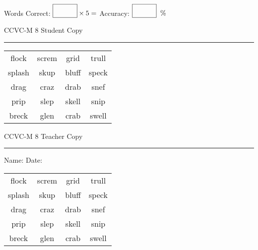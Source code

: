 \documentclass{memoir}
\begin{document}
\small

Words Correct: $\fbox{\phantom{\huge 100}} \times 5 = $ Accuracy: $\fbox{\phantom{\huge 100}}\;\; \%$ 

\vfill

\newpage


\footnotesize \noindent
CCVC-M 8 \hfill Student Copy
\smallskip
\hrule

\Large

\setlength{\tabcolsep}{14pt}
\def\arraystretch{3}

{\selectfont


\begin{vplace}[0.5]
\begin{center}
\begin{tabular}{cccc}
flock & screm & grid & trull \\
splash & skup & bluff & speck \\
drag        & craz        & drab             & snef \\
prip & slep            & skell & snip \\
breck       & glen & crab        & swell \\
\end{tabular}
\end{center}
\end{vplace}

}

\newpage

\footnotesize \noindent
CCVC-M 8 \hfill Teacher Copy
\smallskip
\hrule

\small

\vfill

\noindent
Name: \underline{\hspace{1.75in}} \hfill Date: \underline{\hspace{1in}}

\Large

{\selectfont


\begin{vplace}[0.5]
\begin{center}
\begin{tabular}{cccc}
flock & screm & grid & trull \\
splash & skup & bluff & speck \\
drag        & craz        & drab             & snef \\
prip & slep            & skell & snip \\
breck       & glen & crab        & swell \\
\end{tabular}
\end{center}
\end{vplace}



}
\end{document}
